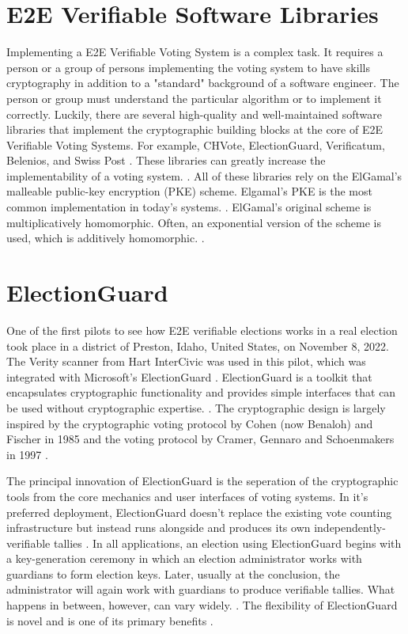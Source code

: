 \section{E2E Verifiable Software Libraries}
Implementing a E2E Verifiable Voting System is a complex task. It requires a person or a group of persons implementing the voting system to have skills cryptography in addition to a "standard" background of a software engineer. The person or group must understand the particular algorithm or to implement it correctly. Luckily, there are several high-quality and well-maintained software libraries that implement the cryptographic building blocks at the core of E2E Verifiable Voting Systems. For example, CHVote, ElectionGuard, Verificatum, Belenios, and Swiss Post \cite[26]{stuve-studys}. These libraries can greatly increase the implementability of a voting system. \cite[11]{stuve-studys}. All of these libraries rely on the ElGamal's malleable public-key encryption (PKE) scheme. Elgamal's PKE is the most common implementation in today's systems. \cite[40]{stuve-studys}. ElGamal's original scheme is multiplicatively homomorphic. Often, an exponential version of the scheme is used, which is additively homomorphic. \cite[40]{stuve-studys}.

\section{ElectionGuard}
One of the first pilots to see how E2E verifiable elections works in a real election took place in a district of Preston, Idaho, United States, on November 8, 2022. The Verity scanner from Hart InterCivic was used in this pilot, which was integrated with Microsoft's ElectionGuard \cite{EAC}. ElectionGuard is a toolkit that encapsulates cryptographic functionality and provides simple interfaces that can be used without cryptographic expertise. \cite[1-2]{eg-paper}. The cryptographic design is largely inspired by the cryptographic voting protocol by Cohen (now Benaloh) and Fischer in 1985 and the voting protocol by Cramer, Gennaro and Schoenmakers in 1997 \cite[5]{eg-paper}. 

The principal innovation of ElectionGuard is the seperation of the cryptographic tools from the core mechanics and user interfaces of voting systems. In it's preferred deployment, ElectionGuard doesn't replace the existing vote counting infrastructure but instead runs alongside and produces its own independently-verifiable tallies \cite[1-2]{eg-paper}. In all applications, an election using ElectionGuard begins with a key-generation ceremony in which an election administrator works with guardians to form election keys. Later, usually at the conclusion, the administrator will again work with guardians to produce verifiable tallies. What happens in between, however, can vary widely. \cite[20]{eg-paper}. The flexibility of ElectionGuard is novel and is one of its primary benefits \cite[22]{eg-paper}.

